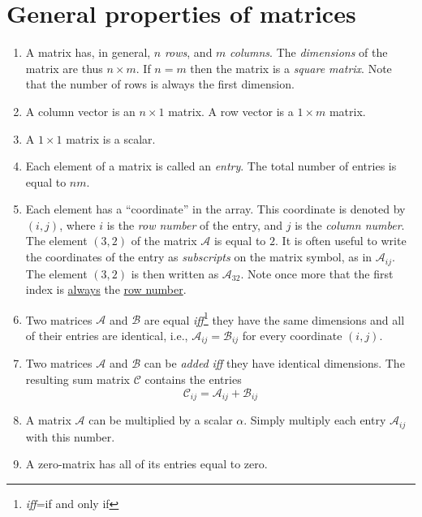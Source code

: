 \section{General properties of matrices}
\begin{enumerate}
\item A matrix has, in general, $n$ \textit{rows}, and $m$ \textit{columns}.  The \textit{dimensions} of the matrix
are thus $n\times m$.  If $n=m$ then the matrix is a \textit{square matrix}.  Note that the number of rows is always 
the first dimension.

\item A column vector is an $n\times 1$ matrix.  A row vector is a $1\times m$ matrix.

\item A $1\times 1$ matrix is a scalar.

\item Each element of a matrix is called an \textit{entry}.  The total number of entries is equal to $nm$.

\item Each element has a ``coordinate'' in the array.  This coordinate is denoted by $(i,j)$, where $i$ is the \textit{row number} of the entry,
and $j$ is the \textit{column number}.  The element $(3,2)$ of the matrix $\mathcal{A}$ is equal to $2$.  It is often useful to write
the coordinates of the entry as \textit{subscripts} on the matrix symbol, as in $\mathcal{A}_{ij}$.  The element $(3,2)$ is then written as $\mathcal{A}_{32}$.
Note once more that the first index is \underline{always} the \underline{row number}.

\item Two matrices $\mathcal{A}$ and $\mathcal{B}$ are equal \textit{iff}\footnote{\textit{iff}=if and only if} they have the same dimensions and 
all of their entries are identical, i.e., $\mathcal{A}_{ij}=\mathcal{B}_{ij}$ for every coordinate $(i,j)$.

\item Two matrices $\mathcal{A}$ and $\mathcal{B}$ can be \textit{added} \textit{iff} they have identical dimensions.  The resulting sum matrix $\mathcal{C}$
contains the entries
\[
\mathcal{C}_{ij}=\mathcal{A}_{ij}+\mathcal{B}_{ij}
\]

\item A matrix $\mathcal{A}$ can be multiplied by a scalar $\alpha$.  Simply multiply each entry $\mathcal{A}_{ij}$ with this number.

\item A zero-matrix has all of its entries equal to zero.


\end{enumerate}
